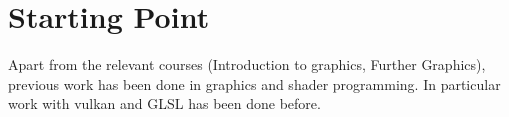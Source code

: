 \section*{Starting Point}

Apart from the relevant courses (Introduction to graphics, Further Graphics),
previous work has been done in graphics and shader programming. In particular
work with vulkan and GLSL has been done before.
